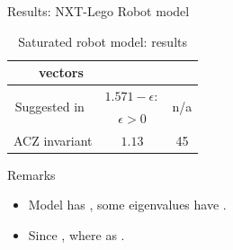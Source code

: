 \begin{frame}{Results: NXT-Lego Robot model}
{\begin{minipage}{0.48\textwidth}
\begin{table}
{\begin{tabular}{|l|c|c|c|}
& vectors & & \\
\hline
\multicolumn{2}{|c|}{\multirow{2}{*}{Suggested in~\cite{heinz2014benchmark}}} &
$1.571-\epsilon:$ & \multirow{2}{*}{n/a}\\
\multicolumn{2}{|c|}{} & $\epsilon>0$ &\\
\hline
\multicolumn{2}{|c|}{\multirow{2}{*}{ACZ invariant}} & \multirow{2}{*}{$1.13$} &
\multirow{2}{*}{45}\\
\multicolumn{2}{|c|}{} & &\\
\hline
\end{tabular}
}
\caption*{{\footnotesize Saturated robot model: results}}
\end{table}
\end{minipage}
}
\vspace{-2em}
{\small
\begin{alertblock}{Remarks}
\begin{itemize}
\item Model has , some eigenvalues have .
\item Since , where as  .
\end{itemize}
\end{alertblock}
}
\end{frame}

